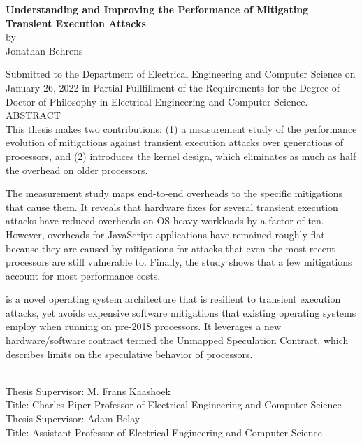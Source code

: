 
\singlespace
\begin{center}

{\large \bf Understanding and Improving the Performance of Mitigating Transient Execution Attacks} \\[.5\baselineskip]
by \\
Jonathan Behrens \\[.5\baselineskip]
\end{center}

Submitted to the Department of Electrical Engineering and Computer Science on January 26, 2022 in Partial Fullfillment of the Requirements for the Degree of Doctor of Philosophy in Electrical Engineering and Computer Science.\\[.5\baselineskip]

\noindent
ABSTRACT \\

This thesis makes two contributions:
(1) a measurement study of the performance evolution of mitigations against transient execution attacks over generations of processors, and (2) introduces the \sys kernel design, which eliminates as much as half the overhead on older processors.

The measurement study maps end-to-end overheads to the specific mitigations that cause them.
It reveals that hardware fixes for several transient execution attacks have reduced overheads on OS heavy workloads by a factor of ten.
However, overheads for JavaScript applications have remained roughly flat because they are caused by mitigations for attacks that even the most recent processors are still vulnerable to.
Finally, the study shows that a few mitigations account for most performance costs.


\sys is a novel operating system architecture that is resilient to transient execution attacks, yet avoids expensive software mitigations that existing operating systems employ when running on pre-2018 processors.
It leverages a new hardware/software contract termed the Unmapped Speculation Contract, which describes limits on the speculative behavior of processors.

~\\[\baselineskip]

\noindent
Thesis  Supervisor:  M.  Frans  Kaashoek \\
Title:  Charles  Piper  Professor  of Electrical  Engineering  and  Computer  Science \\[.5\baselineskip]
\noindent
Thesis  Supervisor:  Adam Belay \\
Title:  Assistant Professor  of Electrical  Engineering  and  Computer  Science \\

\doublespace